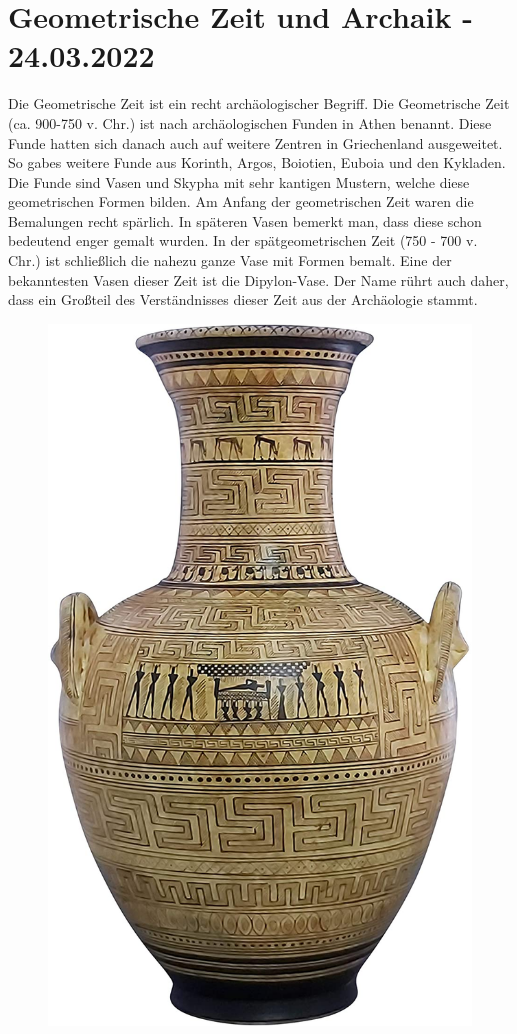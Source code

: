 \documentclass{article}
\begin{document}
	\section{Geometrische Zeit und Archaik - 24.03.2022}

	Die Geometrische Zeit ist ein recht archäologischer Begriff. Die Geometrische Zeit (ca. 900-750 v. Chr.) ist nach archäologischen Funden in Athen benannt. Diese Funde hatten sich danach auch auf weitere Zentren in Griechenland ausgeweitet. So gabes weitere Funde aus Korinth, Argos, Boiotien, Euboia und den Kykladen. Die Funde sind Vasen und Skypha mit sehr kantigen Mustern, welche diese geometrischen Formen bilden. Am Anfang der geometrischen Zeit waren die Bemalungen recht spärlich. In späteren Vasen bemerkt man, dass diese schon bedeutend enger gemalt wurden. In der spätgeometrischen Zeit (750 - 700 v. Chr.) ist schließlich die nahezu ganze Vase mit Formen bemalt. Eine der bekanntesten Vasen dieser Zeit ist die Dipylon-Vase. Der Name rührt auch daher, dass ein Großteil des Verständnisses dieser Zeit aus der Archäologie stammt. 
	\begin{figure}
	\includegraphics[scale=0.2]{Dipylon.jpg}
	\end{figure}
\end{document}
